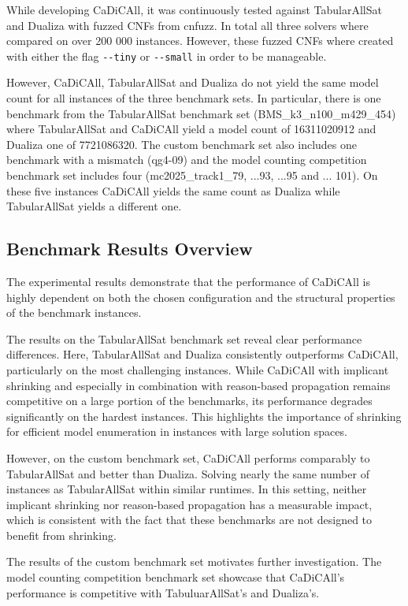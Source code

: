 \documentclass[12pt,a4paper]{article}
\begin{document}
While developing CaDiCAll, it was continuously tested against TabularAllSat and Dualiza with fuzzed CNFs from cnfuzz. In total all three solvers where compared on over 200 000 instances. However, these fuzzed CNFs where created with either the flag \verb|--tiny| or \verb|--small| in order to be manageable.

However, CaDiCAll, TabularAllSat and Dualiza do not yield the same model count for all instances of the three benchmark sets. In particular, there is one benchmark from the TabularAllSat benchmark set (BMS\_k3\_n100\_m429\_454) where TabularAllSat and CaDiCAll yield a model count of 16311020912 and Dualiza one of 7721086320. The custom benchmark set also includes one benchmark with a mismatch (qg4-09) and the model counting competition benchmark set includes four (mc2025\_track1\_79, ...93, ...95 and ... 101). On these five instances CaDiCAll yields the same count as Dualiza while TabularAllSat yields a different one.

\subsection{Benchmark Results Overview}

The experimental results demonstrate that the performance of CaDiCAll is highly dependent on both the chosen configuration and the structural properties of the benchmark instances.

The results on the TabularAllSat benchmark set reveal clear performance differences. Here, TabularAllSat and Dualiza consistently outperforms CaDiCAll, particularly on the most challenging instances. While CaDiCAll with implicant shrinking and especially in combination with reason-based propagation remains competitive on a large portion of the benchmarks, its performance degrades significantly on the hardest instances. This highlights the importance of shrinking for efficient model enumeration in instances with large solution spaces.

However, on the custom benchmark set, CaDiCAll performs comparably to TabularAllSat and better than Dualiza. Solving nearly the same number of instances as TabularAllSat within similar runtimes. In this setting, neither implicant shrinking nor reason-based propagation has a measurable impact, which is consistent with the fact that these benchmarks are not designed to benefit from shrinking.

The results of the custom benchmark set motivates further investigation. The model counting competition benchmark set showcase that CaDiCAll's performance is competitive with TabuluarAllSat's and Dualiza's. 
\end{document}
